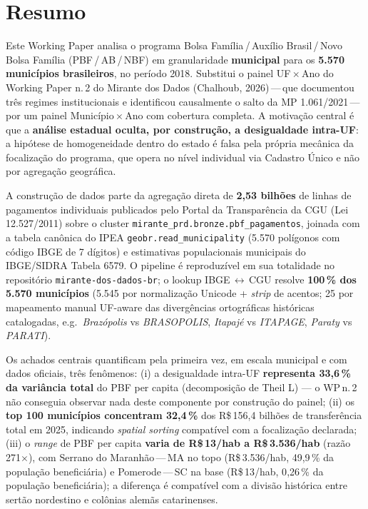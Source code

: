 \documentclass[12pt,a4paper,oneside]{article}
\newcommand{\rs}{R\$\,}
\begin{document}
\section*{Resumo}

Este Working Paper analisa o programa Bolsa Família\,/\,Auxílio Brasil\,/\,Novo
Bolsa Família (PBF\,/\,AB\,/\,NBF) em granularidade \textbf{municipal} para os
\textbf{5.570 municípios brasileiros}, no período 2018. Substitui
o painel UF\,$\times$\,Ano do Working Paper n.\,2 do Mirante dos Dados
(Chalhoub, 2026)\,---\,que documentou três regimes institucionais e identificou
causalmente o salto da MP 1.061/2021\,---\,por um painel
Município\,$\times$\,Ano com cobertura completa. A motivação central é que a
\textbf{análise estadual oculta, por construção, a desigualdade intra-UF}: a
hipótese de homogeneidade dentro do estado é falsa pela própria mecânica da
focalização do programa, que opera no nível individual via Cadastro Único e
não por agregação geográfica.

A construção de dados parte da agregação direta de
\textbf{2{,}53 bilhões} de linhas de pagamentos individuais publicados pelo
Portal da Transparência da CGU (Lei 12.527/2011) sobre o cluster
\texttt{mirante\_prd.bronze.pbf\_pagamentos}, joinada com a tabela canônica
do IPEA \texttt{geobr.read\_municipality} (5.570 polígonos com código IBGE
de 7 dígitos) e estimativas populacionais municipais do IBGE/SIDRA Tabela
6579. O pipeline é reproduzível em sua totalidade no repositório
\texttt{mirante-dos-dados-br}; o lookup IBGE\,$\leftrightarrow$\,CGU resolve
\textbf{100\,\% dos 5.570 municípios} (5.545 por normalização Unicode +
\textit{strip} de acentos; 25 por mapeamento manual UF-aware das divergências
ortográficas históricas catalogadas, e.g.\ \textit{Brazópolis} vs
\textit{BRASOPOLIS}, \textit{Itapajé} vs \textit{ITAPAGE}, \textit{Paraty}
vs \textit{PARATI}).

Os achados centrais quantificam pela primeira vez, em escala municipal e
com dados oficiais, três fenômenos: (i) a desigualdade intra-UF
\textbf{representa 33{,}6\,\% da variância total} do PBF per capita
(decomposição de Theil L) — o WP\,n.\,2 não conseguia observar nada deste
componente por construção do painel; (ii) os \textbf{top 100 municípios
concentram 32{,}4\,\%} dos R\$\,156{,}4 bilhões de transferência total em
2025, indicando \textit{spatial sorting} compatível com a focalização
declarada; (iii) o \textit{range} de PBF per capita
\textbf{varia de \rs 13/hab a \rs 3.536/hab} (razão 271$\times$), com Serrano
do Maranhão\,---\,MA no topo (\rs 3.536/hab, 49{,}9\,\% da população
beneficiária) e Pomerode\,---\,SC na base (\rs 13/hab, 0{,}26\,\% da população
beneficiária); a diferença é compatível com a divisão histórica entre
sertão nordestino e colônias alemãs catarinenses.
\end{document}
